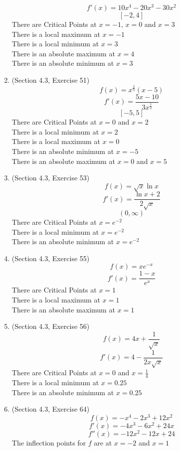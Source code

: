 \documentclass{article}
\begin{document}
\begin{enumerate}
        $$f'(x) = 10x^4 - 20x^3 - 30x^2$$
        $$[-2, 4]$$
        There are Critical Points at $x = -1$, $x = 0$ and $x = 3$ \\
        There is a local maximum at $x = -1$ \\
        There is a local minimum at $x = 3$ \\
        There is an absolute maximum at $x = 4$ \\
        There is an absolute minimum at $x = 3$ \\
    \item (Section 4.3, Exercise 51)
        $$f(x) = x^{\frac{2}{3}}\left(x - 5\right)$$
        $$f'(x) = \frac{5x - 10}{3x^{\frac{1}{3}}}$$
        $$[-5, 5]$$
        There are Critical Points at $x = 0$ and $x = 2$ \\
        There is a local minimum at $x = 2$ \\
        There is a local maximum at $x = 0$ \\
        There is an absolute minimum at $x = -5$ \\
        There is an absolute maximum at $x = 0$ and $x = 5$
    \item (Section 4.3, Exercise 53)
        $$f(x) = \sqrt{x}\ln{x}$$
        $$f'(x) = \frac{\ln{x} + 2}{2\sqrt{x}}$$
        $$(0, \infty)$$
        There are Critical Points at $x = e^{-2}$ \\
        There is a local minimum at $x = e^{-2}$ \\
        There is an absolute minimum at $x = e^{-2}$
    \item (Section 4.3, Exercise 55)
        $$f(x) = xe^{-x}$$
        $$f'(x) = \frac{1 - x}{e^x}$$
        There are Critical Points at $x = 1$ \\
        There is a local maximum at $x = 1$ \\
        There is an absolute maximum at $x = 1$
    \item (Section 4.3, Exercise 56)
        $$f(x) = 4x + \frac{1}{\sqrt{x}}$$
        $$f'(x) = 4 -\frac{1}{2x\sqrt{x}}$$
        There are Critical Points at $x = 0$ and $x = \frac{1}{4}$ \\
        There is a local minimum at $x = 0.25$ \\
        There is an absolute minimum at $x = 0.25$
    \item (Section 4.3, Exercise 64)
        $$f(x) = -x^4 - 2x^3 + 12x^2$$
        $$f'(x) = -4x^3 - 6x^2 + 24x$$
        $$f''(x) = -12x^2 - 12x + 24$$
        The inflection points for $f$ are at $x = -2$ and $x = 1$ \\

\end{enumerate}
\end{document}
